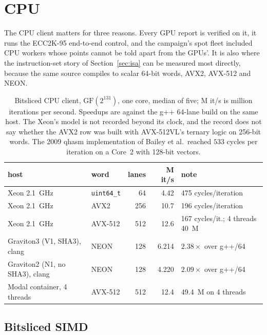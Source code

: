\section{CPU}
\label{sec:cpu}

The CPU client matters for three reasons. Every GPU report is verified
on it, it runs the ECC2K-95 end-to-end control, and the campaign's spot
fleet included CPU workers whose points cannot be told apart from the
GPUs'. It is also where the instruction-set story of
Section~\ref{sec:isa} can be measured most directly, because the same
source compiles to scalar 64-bit words, AVX2, AVX-512 and NEON.

\begin{table}[t]
\centering
\small
\caption{Bitsliced CPU client, $\mathrm{GF}(2^{131})$, one core, median
  of five; M it/s is million iterations per second. Speedups are against
  the g++ 64-lane build on the same host. The Xeon's model is not
  recorded beyond its clock, and the record does not say whether the
  AVX2 row was built with AVX-512VL's ternary logic on 256-bit words. The 2009 qhasm implementation of Bailey et
  al.\ reached $533$ cycles per iteration on a Core~2 with 128-bit
  vectors.}
\label{tab:cpu}
\begin{tabular}{@{}llrrl@{}}
\toprule
host & word & lanes & M it/s & note \\
\midrule
Xeon 2.1~GHz & \texttt{uint64\_t} & 64 & 4.42 & 475 cycles/iteration \\
Xeon 2.1~GHz & AVX2 & 256 & 10.7 & 196 cycles/iteration \\
Xeon 2.1~GHz & AVX-512 & 512 & 12.6 & 167 cycles/it.; 4 threads 40~M \\
Graviton3 (V1, SHA3), clang & NEON & 128 & 6.214 & $2.38\times$ over g++/64 \\
Graviton2 (N1, no SHA3), clang & NEON & 128 & 4.220 & $2.09\times$ over g++/64 \\
Modal container, 4 threads & AVX-512 & 512 & 12.4 & 49.4~M on 4 threads \\
\bottomrule
\end{tabular}
\end{table}

\subsection{Bitsliced SIMD}
\label{sec:cpu-bitsliced}

